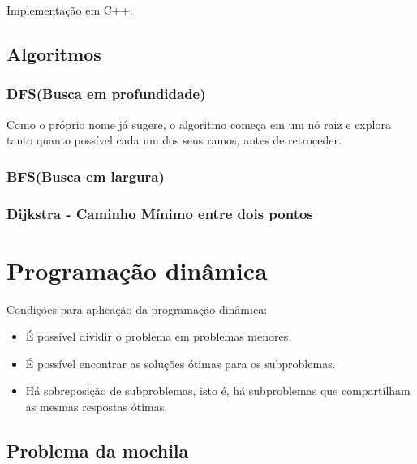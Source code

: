 \documentclass[a4paper,12pt]{article}
\begin{document}
\indent Implementação em C++:


\subsection{Algoritmos}
\subsubsection{DFS(Busca em profundidade)}

Como o próprio nome já sugere, o algoritmo começa em um nó raiz e explora tanto quanto possível cada um dos seus ramos, antes de retroceder.


\subsubsection{BFS(Busca em largura)}


\subsubsection{Dijkstra - Caminho Mínimo entre dois pontos}


\section{Programação dinâmica}

\indent Condições para aplicação da programação dinâmica:

\begin{itemize}
    \item É possível dividir o problema em problemas menores.
    \item É possível encontrar as soluções ótimas para os subproblemas.
    \item Há sobreposição de subproblemas, isto é, há subproblemas que compartilham as mesmas respostas ótimas.
\end{itemize}

\subsection{Problema da mochila}
\end{document}
